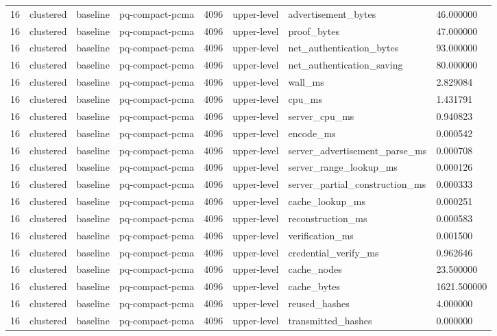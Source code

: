 \begin{tabular}{llllllll}
16 & clustered & baseline & pq-compact-pcma & 4096 & upper-level & advertisement\_bytes & 46.000000 \\
16 & clustered & baseline & pq-compact-pcma & 4096 & upper-level & proof\_bytes & 47.000000 \\
16 & clustered & baseline & pq-compact-pcma & 4096 & upper-level & net\_authentication\_bytes & 93.000000 \\
16 & clustered & baseline & pq-compact-pcma & 4096 & upper-level & net\_authentication\_saving & 80.000000 \\
16 & clustered & baseline & pq-compact-pcma & 4096 & upper-level & wall\_ms & 2.829084 \\
16 & clustered & baseline & pq-compact-pcma & 4096 & upper-level & cpu\_ms & 1.431791 \\
16 & clustered & baseline & pq-compact-pcma & 4096 & upper-level & server\_cpu\_ms & 0.940823 \\
16 & clustered & baseline & pq-compact-pcma & 4096 & upper-level & encode\_ms & 0.000542 \\
16 & clustered & baseline & pq-compact-pcma & 4096 & upper-level & server\_advertisement\_parse\_ms & 0.000708 \\
16 & clustered & baseline & pq-compact-pcma & 4096 & upper-level & server\_range\_lookup\_ms & 0.000126 \\
16 & clustered & baseline & pq-compact-pcma & 4096 & upper-level & server\_partial\_construction\_ms & 0.000333 \\
16 & clustered & baseline & pq-compact-pcma & 4096 & upper-level & cache\_lookup\_ms & 0.000251 \\
16 & clustered & baseline & pq-compact-pcma & 4096 & upper-level & reconstruction\_ms & 0.000583 \\
16 & clustered & baseline & pq-compact-pcma & 4096 & upper-level & verification\_ms & 0.001500 \\
16 & clustered & baseline & pq-compact-pcma & 4096 & upper-level & credential\_verify\_ms & 0.962646 \\
16 & clustered & baseline & pq-compact-pcma & 4096 & upper-level & cache\_nodes & 23.500000 \\
16 & clustered & baseline & pq-compact-pcma & 4096 & upper-level & cache\_bytes & 1621.500000 \\
16 & clustered & baseline & pq-compact-pcma & 4096 & upper-level & reused\_hashes & 4.000000 \\
16 & clustered & baseline & pq-compact-pcma & 4096 & upper-level & transmitted\_hashes & 0.000000 \\

\end{tabular}
